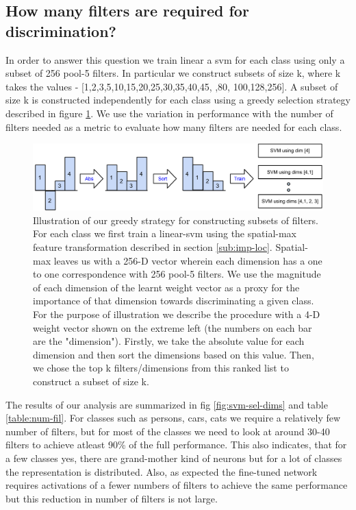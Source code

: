 \subsection{How many filters are required for discrimination?}
\label{sub:how-many}
In order to answer this question we train linear a svm for each class using only a subset of 256 pool-5 filters. In particular we construct subsets of size k, where k takes the values - [1,2,3,5,10,15,20,25,30,35,40,45, ,80, 100,128,256]. A subset of size k is constructed independently for each class using a greedy selection strategy described in figure \ref{fig:sel-strategy}. We use the variation in performance with the number of filters needed as a metric to evaluate how many filters are needed for each class. 
  
\begin{figure}[t!]
\centering
\includegraphics[scale=0.35]{images/how-many.pdf}
\caption{Illustration of our greedy strategy for constructing subsets of filters. For each class we first train a linear-svm using the spatial-max feature transformation described in section \ref{sub:imp-loc}. Spatial-max leaves us with a 256-D vector wherein each dimension has a one to one correspondence with 256 pool-5 filters. We use the magnitude of each dimension of the learnt weight vector as a proxy for the importance of that dimension towards discriminating a given class. For the purpose of illustration we describe the procedure with a 4-D weight vector shown on the extreme left (the numbers on each bar are the "dimension"). Firstly, we take the absolute value for each dimension and then sort the dimensions based on this value. Then, we chose the top k filters/dimensions from this ranked list to construct a subset of size k.}
\label{fig:sel-strategy}
\end{figure}

The results of our analysis are summarized in fig \ref{fig:svm-sel-dims} and table \ref{table:num-fil}. For classes such as persons, cars, cats we require a relatively few number of filters, but for most of the classes we need to look at around 30-40 filters to achieve atleast 90\% of the full performance. This also indicates, that for a few classes yes, there are grand-mother kind of neurons but for a lot of classes the representation is distributed. Also, as expected the fine-tuned network requires activations of a fewer numbers of filters to achieve the same performance but this reduction in number of filters is not large. 

